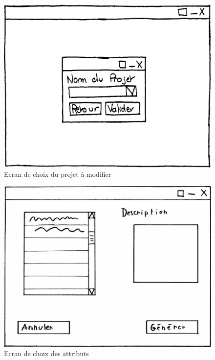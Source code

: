 \documentclass[12pt]{report}
\begin{document}
\begin{figure}
\centering
\includegraphics[scale=0.5]{IHM_5a.png}
\caption{Ecran de choix du projet à modifier}
\end{figure}
\begin{figure}
\centering
\includegraphics[scale=0.25]{Generation.png}
\caption{Ecran de choix des attributs}
\end{figure}
\end{document}
